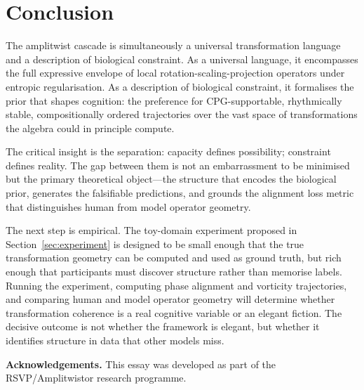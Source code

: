 \documentclass[12pt, a4paper]{article}
\theoremstyle{remark}
\theoremstyle{definition}
\begin{document}
\section{Conclusion}
\label{sec:conclusion}

The amplitwist cascade is simultaneously a universal transformation language and a
description of biological constraint.  As a universal language, it encompasses the full
expressive envelope of local rotation-scaling-projection operators under entropic
regularisation.  As a description of biological constraint, it formalises the prior that
shapes cognition: the preference for CPG-supportable, rhythmically stable, compositionally
ordered trajectories over the vast space of transformations the algebra could in principle
compute.

The critical insight is the separation: capacity defines possibility; constraint defines
reality.  The gap between them is not an embarrassment to be minimised but the primary
theoretical object---the structure that encodes the biological prior, generates the
falsifiable predictions, and grounds the alignment loss metric that distinguishes human from
model operator geometry.

The next step is empirical.  The toy-domain experiment proposed in
Section~\ref{sec:experiment} is designed to be small enough that the true transformation
geometry can be computed and used as ground truth, but rich enough that participants must
discover structure rather than memorise labels.  Running the experiment, computing phase
alignment and vorticity trajectories, and comparing human and model operator geometry will
determine whether transformation coherence is a real cognitive variable or an elegant
fiction.  The decisive outcome is not whether the framework is elegant, but whether it
identifies structure in data that other models miss.

\bigskip
\noindent\textbf{Acknowledgements.}\quad
This essay was developed as part of the RSVP\slash Amplitwistor research programme.

\clearpage
\appendix

\end{document}
